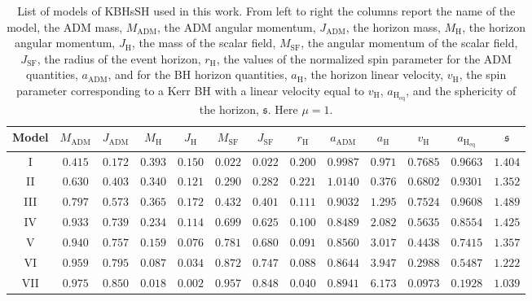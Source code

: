 \documentclass[twocolumn,aps,showpacs,showkeys,prd,superscriptaddress,byrevtex, amsmath]{revtex4-1}
\begin{document}
\begin{table}[t]
\caption{List of models of KBHsSH used in this work. From left to right the columns report the name of the model, the ADM mass, $M_{\mathrm{ADM}}$, the ADM angular momentum, $J_{\mathrm{ADM}}$, the horizon mass, $M_{\mathrm{H}}$, the horizon angular momentum, $J_{\mathrm{H}}$, the mass of the scalar field, $M_{\mathrm{SF}}$, the angular momentum of the scalar field, $J_{\mathrm{SF}}$, the radius of the event horizon, $r_{\mathrm{H}}$, the values of the normalized spin parameter for the ADM quantities, $a_{\mathrm{ADM}}$, and for the BH horizon quantities, $a_{\mathrm{H}}$, the horizon linear velocity, $v_{\mathrm{H}}$, the spin parameter corresponding to a Kerr BH with a linear velocity equal to $v_{\mathrm{H}}$, $a_{\mathrm{H_{eq}}}$, and the sphericity of the horizon, $\mathfrak{s}$. Here $\mu=1$.}        
\label{models_list}      
\centering          
\begin{tabular}{c c c c  c c c c   c c c c c}
\hline\hline       
 Model & $M_{\mathrm{ADM}}$ & $J_{\mathrm{ADM}}$ & $M_{\mathrm{H}}$ &  $J_{\mathrm{H}}$ & $M_{\mathrm{SF}}$ & $J_{\mathrm{SF}}$ & $r_{\mathrm{H}}$ & $a_{\mathrm{ADM}}$ & $a_{\mathrm{H}}$ & $v_{\mathrm{H}}$ & $a_{\mathrm{H_{eq}}}$ & $\mathfrak{s}$\\ 
\hline           
I & $0.415$ & $0.172$ & $0.393$ &  $0.150$  & $0.022$ & $0.022$ & $0.200$ & $0.9987$ & $0.971$ & $0.7685$ & $0.9663$ & $1.404$\\ 
II & $0.630$ & $0.403$ & $0.340$ &  $0.121$  & $0.290$ & $0.282$ & $0.221$ & $1.0140$ & $0.376$ & $0.6802$ & $0.9301$ & $1.352$ \\
III & $0.797$ & $0.573$ & $0.365$ &  $0.172$  & $0.432$ & $0.401$ & $0.111$ & $0.9032$ & $1.295$ & $0.7524$ & $0.9608$ & $1.489$ \\ 
IV & $0.933$ & $0.739$ & $0.234$ &  $0.114$  & $0.699$ & $0.625$ & $0.100$ & $0.8489$ & $2.082$ & $0.5635$ & $0.8554$ & $1.425$ \\ 
V & $0.940$ & $0.757$ & $0.159$ &  $0.076$  & $0.781$ & $0.680$ & $0.091$ & $0.8560$ & $3.017$ & $0.4438$ & $0.7415$ & $1.357$ \\ 
VI & $0.959$ & $0.795$ & $0.087$ &  $0.034$  & $0.872$ & $0.747$ & $0.088$ & $0.8644$ & $3.947$ & $0.2988$ & $0.5487$ & $1.222$ \\ 
VII & $0.975$ & $0.850$ & $0.018$ &  $0.002$  & $0.957$ & $0.848$ & $0.040$ & $0.8941$ & $6.173$ & $0.0973$ & $0.1928$ & $1.039$ \\ 
\hline      
\end{tabular}
\end{table}
\end{document}
